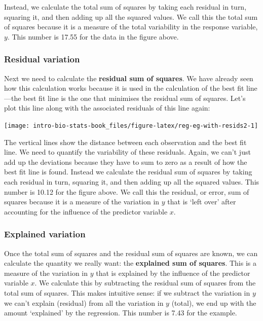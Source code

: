\documentclass[
]{book}
\begin{document}
Instead, we calculate the total sum of squares by taking each residual in turn, squaring it, and then adding up all the squared values. We call this the total sum of squares because it is a measure of the total variability in the response variable, \(y\). This number is 17.55 for the data in the figure above.

\hypertarget{residual-variation}{%
\subsubsection*{Residual variation}\label{residual-variation}}

Next we need to calculate the \textbf{residual sum of squares}. We have already seen how this calculation works because it is used in the calculation of the best fit line---the best fit line is the one that minimises the residual sum of squares. Let's plot this line along with the associated residuals of this line again:

\begin{center}\texttt{[image: intro-bio-stats-book\_files/figure-latex/reg-eg-with-resids2-1]} \end{center}

The vertical lines show the distance between each observation and the best fit line. We need to quantify the variability of these residuals. Again, we can't just add up the deviations because they have to sum to zero as a result of how the best fit line is found. Instead we calculate the residual sum of squares by taking each residual in turn, squaring it, and then adding up all the squared values. This number is 10.12 for the figure above. We call this the residual, or error, sum of squares because it is a measure of the variation in \(y\) that is `left over' after accounting for the influence of the predictor variable \(x\).

\hypertarget{explained-variation}{%
\subsubsection*{Explained variation}\label{explained-variation}}

Once the total sum of squares and the residual sum of squares are known, we can calculate the quantity we really want: the \textbf{explained sum of squares}. This is a measure of the variation in \(y\) that is explained by the influence of the predictor variable \(x\). We calculate this by subtracting the residual sum of squares from the total sum of squares. This makes intuitive sense: if we subtract the variation in \(y\) we can't explain (residual) from all the variation in \(y\) (total), we end up with the amount `explained' by the regression. This number is 7.43 for the example.
\end{document}
